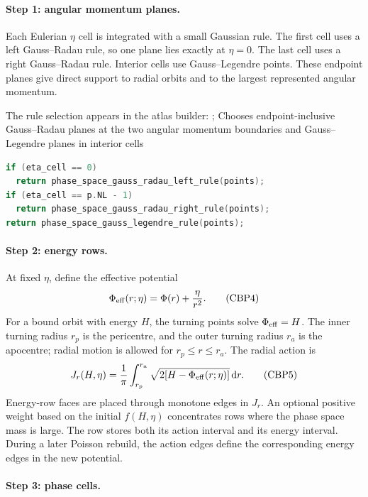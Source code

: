 \paragraph{Step 1: angular momentum planes.}

Each Eulerian \(\eta\) cell is integrated with a small Gaussian rule.  The
first cell uses a left Gauss--Radau rule, so one plane lies exactly at
\(\eta=0\).  The last cell uses a right Gauss--Radau rule.  Interior cells use
Gauss--Legendre points.  These endpoint planes give direct support to radial
orbits and to the largest represented angular momentum.

The rule selection appears in the atlas builder:
{;
 }
{Chooses endpoint-inclusive Gauss--Radau planes at the two angular momentum
 boundaries and Gauss--Legendre planes in interior cells}
\begin{lstlisting}[language=C++]
if (eta_cell == 0)
  return phase_space_gauss_radau_left_rule(points);
if (eta_cell == p.NL - 1)
  return phase_space_gauss_radau_right_rule(points);
return phase_space_gauss_legendre_rule(points);
\end{lstlisting}

\paragraph{Step 2: energy rows.}

At fixed \(\eta\), define the effective potential
\[
  \Phi_{\rm eff}(r;\eta)=\Phi(r)+\frac{\eta}{r^2}.       \tag{CBP4}
\]
For a bound orbit with energy \(H\), the turning points solve
\(\Phi_{\rm eff}=H\).  The inner turning radius
\(r_p\) is the pericentre, and the outer turning radius \(r_a\) is the
apocentre; radial motion is allowed for \(r_p\le r\le r_a\).  The radial
action is
\[
  J_r(H,\eta)=\frac{1}{\pi}
  \int_{r_p}^{r_a}\sqrt{2[H-\Phi_{\rm eff}(r;\eta)]}\,\mathrm d r.  \tag{CBP5}
\]
Energy-row faces are placed through monotone edges in \(J_r\).  An optional
positive weight based on the initial \(f(H,\eta)\) concentrates rows where
the phase space mass is large.  The row stores both its action interval and
its energy interval.  During a later Poisson rebuild, the action edges define
the corresponding energy edges in the new potential.

\paragraph{Step 3: phase cells.}


